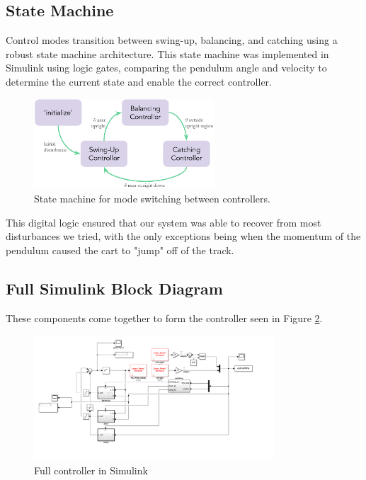 \documentclass[12pt]{article}
\begin{document}
\subsection{State Machine}
Control modes transition between swing-up, balancing, and catching using a robust state machine architecture.
This state machine was implemented in Simulink using logic gates, comparing the pendulum angle and velocity to determine the current state and enable the correct controller.

\begin{figure}[H]
    \centering
    \includegraphics[width=0.6\textwidth]{figures/state_machine.png}
    \caption{State machine for mode switching between controllers.}
    \label{fig:state_machine}
\end{figure}

This digital logic ensured that our system was able to recover from most disturbances we tried, with the only exceptions being when the momentum of the pendulum caused the cart to "jump" off of the track.

\subsection{Full Simulink Block Diagram}
These components come together to form the controller seen in Figure \ref{fig:full_c}.

\begin{figure}[H]
    \centering
    \includegraphics[width=0.8\textwidth]{figures/full-controller.png}
    \caption{Full controller in Simulink}
    \label{fig:full_c}
\end{figure}
\end{document}
